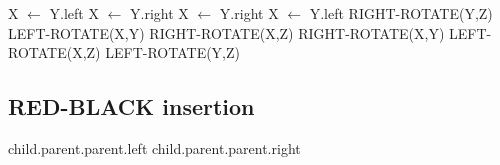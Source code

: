 \documentclass{article}
\begin{document}
\begin{algorithm}
\caption{BALANCE(Z,Y)}
\begin{algorithmic}
{
			\STATE X {$\leftarrow$} Y.left 
		\ELSE	
			\STATE X {$\leftarrow$} Y.right
		\STATE X {$\leftarrow$} Y.right
		\ELSE
			\STATE X {$\leftarrow$} Y.left
		\ENDIF
	\ENDIF
	{
			\STATE RIGHT-ROTATE(Y,Z)
		\ELSE
			\STATE LEFT-ROTATE(X,Y)
			\STATE RIGHT-ROTATE(X,Z)
		\ENDIF
	}
	\ELSE
	{
		{
			\STATE RIGHT-ROTATE(X,Y)
			\STATE LEFT-ROTATE(X,Z)
		}
		\ELSE
		{
			\STATE LEFT-ROTATE(Y,Z)
		}
		\ENDIF
	}
	\ENDIF
}
\end{algorithmic}
\end{algorithm}

\newpage
\subsection{RED-BLACK insertion}

\begin{algorithm}
\caption{UNCL(child)}
\begin{algorithmic}
{
		\RETURN child.parent.parent.left
	\ELSE
		\RETURN child.parent.parent.right
	\ENDIF
}
\end{algorithmic}
\end{algorithm}
\end{document}
